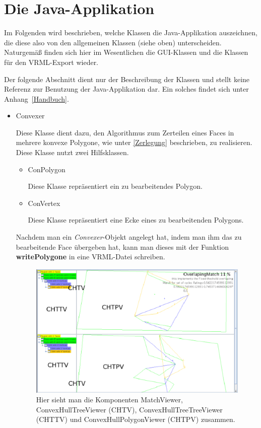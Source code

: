 \section{Die Java-Applikation}\label{java}
Im Folgenden  wird beschrieben, welche Klassen die Java-Applikation auszeichnen, die diese also von den allgemeinen Klassen (siehe oben) unterscheiden. Naturgemäß finden sich hier im Wesentlichen die GUI-Klassen und die Klassen für den VRML-Export wieder.

Der folgende Abschnitt dient nur der Beschreibung der Klassen und stellt keine Referenz zur Benutzung der Java-Applikation dar. Ein solches findet sich unter Anhang~\vref{Handbuch}.

\begin{itemize}
\item Convexer

Diese Klasse dient dazu, den Algorithmus zum Zerteilen eines Faces in mehrere konvexe Polygone, wie unter \vref{Zerlegung} beschrieben, zu realisieren. Diese Klasse nutzt zwei Hilfsklassen.
\begin{itemize}

\item ConPolygon

Diese Klasse repräsentiert ein zu bearbeitendes Polygon.
\item ConVertex

Diese Klasse repräsentiert eine Ecke eines zu bearbeitenden Polygons.
\end{itemize}

Nachdem man ein \textit{Convexer}-Objekt angelegt hat, indem man ihm das zu bearbeitende Face übergeben hat, kann man dieses mit der Funktion \textbf{writePolygone} in eine VRML-Datei schreiben.

\begin{figure}
	\centering
	\includegraphics[scale=0.8]{MatchViewer.eps}
	\caption[Ein MatchViewer mit allen Unteklassen] {Hier sieht man die Komponenten MatchViewer, ConvexHullTreeViewer (CHTV), ConvexHullTreeTreeViewer (CHTTV) und ConvexHullPolygonViewer (CHTPV) zusammen.}
	\label{fig:MatchViewer}
\end{figure}


\end{itemize}
